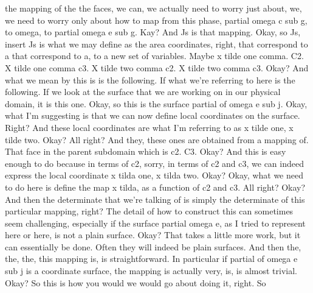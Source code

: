 \documentclass[10pt]{article}
\begin{document}
the mapping of the the faces, we can, we actually need to worry just about, we, we need to worry only about how to map from this phase, partial omega c sub g, to omega, to partial omega e sub g. Kay? And Js is that mapping. Okay, so Js, insert Js is what we may define as the area coordinates, right, that correspond to a that correspond to a, to a new set of variables. Maybe x tilde one comma. C2. X tilde one comma c3. X tilde two comma c2. X tilde two comma c3. Okay? And what we mean by this is is the following. If what we're referring to here is the following. If we look at the surface that we are working on in our physical domain, it is this one. Okay, so this is the surface partial of omega e sub j. Okay, what I'm suggesting is that we can now define local coordinates on the surface. Right? And these local coordinates are what I'm referring to as x tilde one, x tilde two. Okay? All right? And they, these ones are obtained from a mapping of. That face in the parent subdomain which is c2. C3. Okay? And this is easy enough to do because in terms of c2, sorry, in terms of c2 and c3, we can indeed express the local coordinate x tilda one, x tilda two. Okay? Okay, what we need to do here is define the map x tilda, as a function of c2 and c3. All right? Okay? And then the determinate that we're talking of is simply the determinate of this particular mapping, right? The detail of how to construct this can sometimes seem challenging, especially if the surface partial omega e, as I tried to represent here or here, is not a plain surface. Okay? That takes a little more work, but it can essentially be done. Often they will indeed be plain surfaces. And then the, the, the, this mapping is, is straightforward. In particular if partial of omega e sub j is a coordinate surface, the mapping is actually very, is, is almost trivial. Okay? So this is how you would we would go about doing it, right. So
\end{document}
